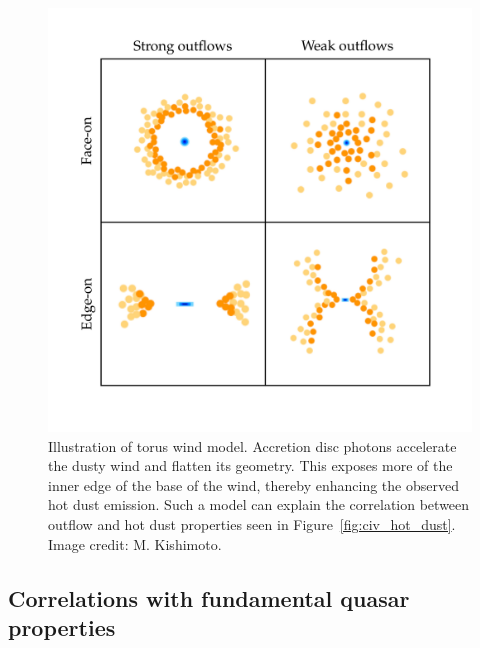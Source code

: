 \begin{figure}[t!]
\centering
  \includegraphics[width=1.0\textwidth]{figures/chapter05/kishimoto.jpg}
\caption[{Illustration of torus wind model.}]{Illustration of torus wind model. Accretion disc photons accelerate the dusty wind and flatten its geometry. This exposes more of the inner edge of the base of the wind, thereby enhancing the observed hot dust emission. Such a model can explain the correlation between outflow and hot dust properties seen in Figure~\ref{fig:civ_hot_dust}. Image credit: M. Kishimoto.}
  \label{fig:kishimoto}
\end{figure}

\subsection{Correlations with fundamental quasar properties}

